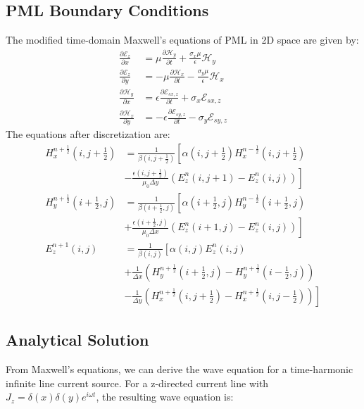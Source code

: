 \documentclass[journal]{IEEEtran}
\begin{document}
\subsection{PML Boundary Conditions}
The modified time-domain Maxwell’s equations of PML in 2D space are given by:
\begin{align}
\frac{\partial \mathcal{E}_z}{\partial x} &= \mu \frac{\partial \mathcal{H}_y}{\partial t} + \frac{\sigma_x \mu}{\epsilon} \mathcal{H}_y \qquad  \\
\frac{\partial \mathcal{E}_z}{\partial y} &= -\mu \frac{\partial \mathcal{H}_x}{\partial t} - \frac{\sigma_y \mu}{\epsilon} \mathcal{H}_x \qquad \\
\frac{\partial \mathcal{H}_y}{\partial x} &= \epsilon \frac{\partial \mathcal{E}_{sx,z}}{\partial t} + \sigma_x \mathcal{E}_{sx,z} \qquad  \\
\frac{\partial \mathcal{H}_x}{\partial y} &= -\epsilon \frac{\partial \mathcal{E}_{sy,z}}{\partial t} - \sigma_y \mathcal{E}_{sy,z} \qquad 
\end{align}
The equations after discretization are:
\begin{align}
H_x^{n+\frac{1}{2}}(i,j+\frac{1}{2}) &= \frac{1}{\beta(i,j+\frac{1}{2})}\left[\alpha(i,j+\frac{1}{2}) H_x^{n-\frac{1}{2}}(i,j+\frac{1}{2}) \right. \nonumber \\
&\left. - \frac{\epsilon(i,j+\frac{1}{2})}{\mu_0 \Delta y}\left(E_z^n(i,j+1) - E_z^n(i,j)\right)\right] \\
H_y^{n+\frac{1}{2}}(i+\frac{1}{2},j) &= \frac{1}{\beta(i+\frac{1}{2},j)}\left[\alpha(i+\frac{1}{2},j) H_y^{n-\frac{1}{2}}(i+\frac{1}{2},j) \right. \nonumber \\
&\left. + \frac{\epsilon(i+\frac{1}{2},j)}{\mu_0 \Delta x}\left(E_z^n(i+1,j) - E_z^n(i,j)\right)\right] \\
E_z^{n+1}(i,j) &= \frac{1}{\beta(i,j)}\left[\alpha(i,j) E_z^n(i,j) \right. \nonumber \\
&\left. + \frac{1}{\Delta x}\left(H_y^{n+\frac{1}{2}}(i+\frac{1}{2},j) - H_y^{n+\frac{1}{2}}(i-\frac{1}{2},j)\right) \right. \nonumber \\
&\left. - \frac{1}{\Delta y}\left(H_x^{n+\frac{1}{2}}(i,j+\frac{1}{2}) - H_x^{n+\frac{1}{2}}(i,j-\frac{1}{2})\right)\right]
\end{align}

\subsection{Analytical Solution}
From Maxwell's equations, we can derive the wave equation for a time-harmonic infinite line current source. For a z-directed current line with $J_z = \delta(x)\delta(y)e^{i\omega t}$, the resulting wave equation is:
\end{document}
